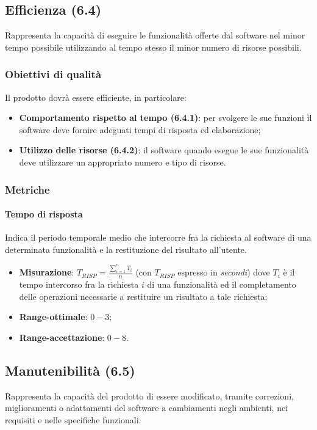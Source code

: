 \subsection{Efficienza (6.4)}
\label{efficienza}
Rappresenta la capacità di eseguire le funzionalità offerte dal software nel minor tempo possibile utilizzando al tempo stesso il minor numero di risorse possibili.
\subsubsection{Obiettivi di qualità}
Il prodotto dovrà essere efficiente, in particolare:
\begin{itemize}
\item \textbf{Comportamento rispetto al tempo (6.4.1)}:  per svolgere le sue funzioni il software deve fornire adeguati tempi di risposta ed elaborazione;
\item \textbf{Utilizzo delle risorse (6.4.2)}: il software quando esegue le sue funzionalità deve utilizzare un appropriato numero e tipo di risorse.
\end{itemize}
\subsubsection{Metriche}
\paragraph{Tempo di risposta}
Indica il periodo temporale medio che intercorre fra la richiesta al software di una determinata funzionalità e la restituzione del risultato all'utente.
\begin{itemize}
\item \textbf{Misurazione}: $T_{RISP} = \frac{\sum_{i=1}^{n} T_{i}}{n}$ (con $T_{RISP}$ espresso in \textit{secondi}) dove $T_{i}$ è il tempo intercorso fra la richiesta $i$ di una funzionalità ed il completamento delle operazioni necessarie a restituire un risultato a tale richiesta;
\item \textbf{Range-ottimale}: $0 - 3$;
\item \textbf{Range-accettazione}: $0 - 8$.
\end{itemize}

\subsection{Manutenibilità (6.5)}
Rappresenta la capacità del prodotto di essere modificato, tramite correzioni, miglioramenti o adattamenti del software a cambiamenti negli ambienti, nei requisiti e nelle specifiche funzionali.

